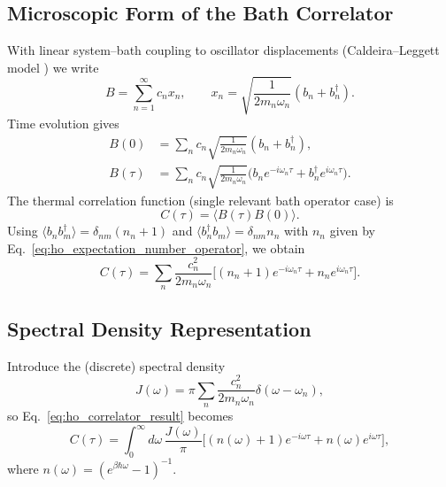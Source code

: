 \subsection{Microscopic Form of the Bath Correlator}
\label{subsec:microscopic_bath_correlator}
With linear system--bath coupling to oscillator displacements (Caldeira--Leggett model \cite{hagstrommorrison2011caldeiraleggettmodel}) we write
\begin{equation} \label{eq:ho_bath_operator}
	B = \sum_{n=1}^{\infty} c_n x_n, \qquad x_n = \sqrt{\frac{1}{2 m_n \omega_n}} (b_n + b_n^{\dagger}).
\end{equation}
Time evolution gives
\begin{align}
	B(0)    & = \sum_{n} c_n \sqrt{\frac{1}{2 m_n \omega_n}} (b_n + b_n^{\dagger}), \label{eq:ho_bath_operator_t0}                                                   \\
	B(\tau) & = \sum_{n} c_n \sqrt{\frac{1}{2 m_n \omega_n}} \Big(b_n e^{-i \omega_n \tau} + b_n^{\dagger} e^{i \omega_n \tau}\Big). \label{eq:ho_bath_operator_tau}
\end{align}
The thermal correlation function (single relevant bath operator case) is
\begin{equation} \label{eq:ho_bath_correlator}
	C(\tau) = \langle B(\tau) B(0) \rangle.
\end{equation}
Using $\langle b_n b_m^{\dagger} \rangle = \delta_{nm}(n_n+1)$ and $\langle b_n^{\dagger} b_m \rangle = \delta_{nm} n_n$ with $n_n$ given by Eq.~\eqref{eq:ho_expectation_number_operator}, we obtain
\begin{equation} \label{eq:ho_correlator_result}
	C(\tau) = \sum_{n} \frac{c_n^2}{2 m_n \omega_n} \Big[(n_n+1) e^{-i \omega_n \tau} + n_n e^{i \omega_n \tau}\Big].
\end{equation}

\subsection{Spectral Density Representation}
\label{subsec:ho_spectral_density}
Introduce the (discrete) spectral density
\begin{equation} \label{eq:ho_bath_spectral_density}
	J(\omega) = \pi \sum_{n} \frac{c_n^2}{2 m_n \omega_n} \delta(\omega - \omega_n),
\end{equation}
so Eq.~\eqref{eq:ho_correlator_result} becomes
\begin{equation} \label{eq:ho_correlator_spectral_density}
	C(\tau) = \int_{0}^{\infty} d\omega \, \frac{J(\omega)}{\pi} \Big[(n(\omega)+1)e^{-i \omega \tau} + n(\omega) e^{i \omega \tau}\Big],
\end{equation}
where $n(\omega)= (e^{\beta \hbar \omega}-1)^{-1}$.

